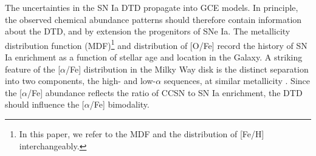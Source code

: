 \documentclass[twocolumn,twocolappendix,linenumbers]{aastex631}
\newcommand{\aFe}{[$\alpha$/Fe]\xspace}
\begin{document}

The uncertainties in the SN Ia DTD propagate into GCE models. In principle, the observed chemical abundance patterns should therefore contain information about the DTD, and by extension the progenitors of SNe Ia. The metallicity distribution function (MDF)\footnote{In this paper, we refer to the MDF and the distribution of [Fe/H] interchangeably.} and distribution of [O/Fe] record the history of SN Ia enrichment as a function of stellar age and location in the Galaxy. A striking feature of the \aFe distribution in the Milky Way disk is the distinct separation into two components, the high- and low-$\alpha$ sequences, at similar metallicity \citep[e.g.,][]{Bensby2014-solarNeighborhoodAbundances}. Since the \aFe abundance reflects the ratio of CCSN to SN Ia enrichment, the DTD should influence the \aFe bimodality.
\end{document}
